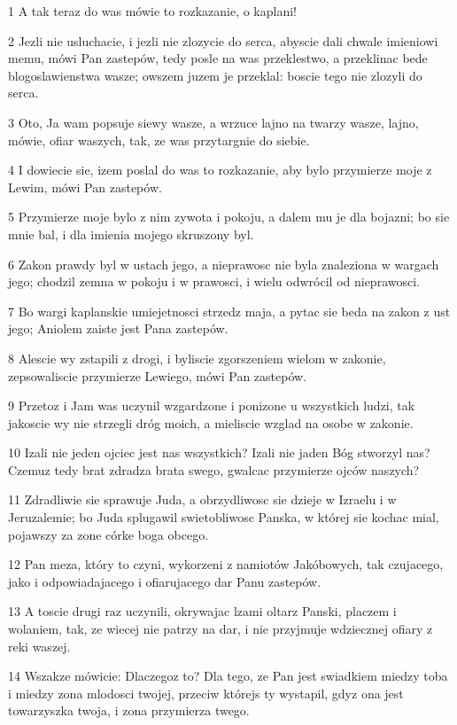 \par 1 A tak teraz do was mówie to rozkazanie, o kaplani!
\par 2 Jezli nie usluchacie, i jezli nie zlozycie do serca, abyscie dali chwale imieniowi memu, mówi Pan zastepów, tedy posle na was przeklestwo, a przeklinac bede blogoslawienstwa wasze; owszem juzem je przeklal: boscie tego nie zlozyli do serca.
\par 3 Oto, Ja wam popsuje siewy wasze, a wrzuce lajno na twarzy wasze, lajno, mówie, ofiar waszych, tak, ze was przytargnie do siebie.
\par 4 I dowiecie sie, izem poslal do was to rozkazanie, aby bylo przymierze moje z Lewim, mówi Pan zastepów.
\par 5 Przymierze moje bylo z nim zywota i pokoju, a dalem mu je dla bojazni; bo sie mnie bal, i dla imienia mojego skruszony byl.
\par 6 Zakon prawdy byl w ustach jego, a nieprawosc nie byla znaleziona w wargach jego; chodzil zemna w pokoju i w prawosci, i wielu odwrócil od nieprawosci.
\par 7 Bo wargi kaplanskie umiejetnosci strzedz maja, a pytac sie beda na zakon z ust jego; Aniolem zaiste jest Pana zastepów.
\par 8 Alescie wy zstapili z drogi, i byliscie zgorszeniem wielom w zakonie, zepsowaliscie przymierze Lewiego, mówi Pan zastepów.
\par 9 Przetoz i Jam was uczynil wzgardzone i ponizone u wszystkich ludzi, tak jakoscie wy nie strzegli dróg moich, a mieliscie wzglad na osobe w zakonie.
\par 10 Izali nie jeden ojciec jest nas wszystkich? Izali nie jaden Bóg stworzyl nas? Czemuz tedy brat zdradza brata swego, gwalcac przymierze ojców naszych?
\par 11 Zdradliwie sie sprawuje Juda, a obrzydliwosc sie dzieje w Izraelu i w Jeruzalemie; bo Juda splugawil swietobliwosc Panska, w której sie kochac mial, pojawszy za zone córke boga obcego.
\par 12 Pan meza, który to czyni, wykorzeni z namiotów Jakóbowych, tak czujacego, jako i odpowiadajacego i ofiarujacego dar Panu zastepów.
\par 13 A toscie drugi raz uczynili, okrywajac lzami oltarz Panski, placzem i wolaniem, tak, ze wiecej nie patrzy na dar, i nie przyjmuje wdziecznej ofiary z reki waszej.
\par 14 Wszakze mówicie: Dlaczegoz to? Dla tego, ze Pan jest swiadkiem miedzy toba i miedzy zona mlodosci twojej, przeciw którejs ty wystapil, gdyz ona jest towarzyszka twoja, i zona przymierza twego.
